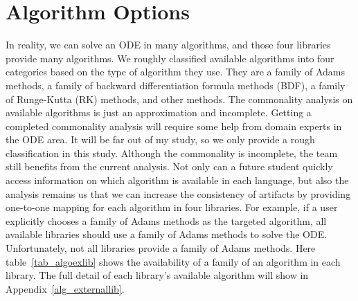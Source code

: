 \section{Algorithm Options}
In reality, we can solve an ODE in many algorithms, and those four libraries provide many algorithms. We roughly classified available algorithms into four categories based on the type of algorithm they use. They are a family of Adams methods, a family of backward differentiation formula methods (BDF), a family of Runge-Kutta (RK) methods, and other methods. The commonality analysis on available algorithms is just an approximation and incomplete. Getting a completed commonality analysis will require some help from domain experts in the ODE area. It will be far out of my study, so we only provide a rough classification in this study. Although the commonality is incomplete, the team still benefits from the current analysis. Not only can a future student quickly access information on which algorithm is available in each language, but also the analysis remains us that we can increase the consistency of artifacts by providing one-to-one mapping for each algorithm in four libraries. For example, if a user explicitly chooses a family of Adams methods as the targeted algorithm, all available libraries should use a family of Adams methods to solve the ODE. Unfortunately, not all libraries provide a family of Adams methods. Here table~\ref{tab_algoexlib} shows the availability of a family of an algorithm in each library. The full detail of each library's available algorithm will show in Appendix~\ref{alg_externallib}.

